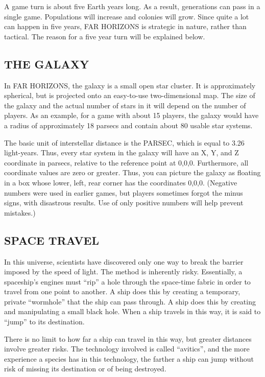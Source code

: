 \documentclass[10pt,titlepage]{article}
\begin{document}
A game turn is about five Earth years long.  As a result, generations can pass
in a single game.  Populations will increase and colonies will grow.  Since
quite a lot can happen in five years, FAR HORIZONS is strategic in nature,
rather than tactical.  The reason for a five year turn will be explained below.


\subsection{THE GALAXY}

In FAR HORIZONS, the galaxy is a small open star cluster.  It is approximately
spherical, but is projected onto an easy-to-use two-dimensional map.  The size
of the galaxy and the actual number of stars in it will depend on the number
of players.  As an example, for a game with about 15 players, the galaxy would
have a radius of approximately 18 parsecs and contain about 80 usable star
systems.

The basic unit of interstellar distance is the PARSEC, which is equal to 3.26
light-years.  Thus, every star system in the galaxy will have an X, Y, and Z
coordinate in parsecs, relative to the reference point at 0,0,0.  Furthermore,
all coordinate values are zero or greater.  Thus, you can picture the galaxy
as floating in a box whose lower, left, rear corner has the coordinates 0,0,0.
(Negative numbers were used in earlier games, but players sometimes forgot the
minus signs, with disastrous results.  Use of only positive numbers will help
prevent mistakes.)


\subsection{SPACE TRAVEL}

In this universe, scientists have discovered only one way to break the barrier
imposed by the speed of light.  The method is inherently risky.  Essentially,
a spaceship's engines must ``rip'' a hole through the space-time fabric in order
to travel from one point to another.  A ship does this by creating a temporary,
private ``wormhole'' that the ship can pass through.  A ship does this by
creating and manipulating a small black hole.  When a ship travels in this
way, it is said to ``jump'' to its destination.

There is no limit to how far a ship can travel in this way, but greater
distances involve greater risks.  The technology involved is called
``avitics'', and the more experience a species has in this technology, the
farther a ship can jump without risk of missing its destination or of being
destroyed.
\end{document}
